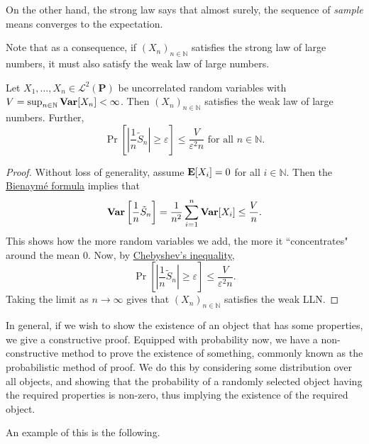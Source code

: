 \vspace{1mm}
On the other hand, the strong law says that almost surely, the sequence of \textit{sample} means converges to the expectation.

\vspace{2mm}
Note that as a consequence, if $(X_n)_{n\in\mathbb{N}}$ satisfies the strong law of large numbers, it must also satisfy the weak law of large numbers.

\begin{ftheo}
\label{uncorr finite var wLLN}
    Let $X_1,\ldots,X_n\in\mathcal{L}^2(\textbf{P})$ be uncorrelated random variables with $V=\sup_{n\in\mathbb{N}}\operatorname{\textbf{Var}}[X_n]<\infty$. Then $(X_n)_{n\in\mathbb{N}}$ satisfies the weak law of large numbers. Further,
    $$\Pr\left[\left|\frac{1}{n}\tilde{S}_n\right|\geq\varepsilon\right]\leq \frac{V}{\varepsilon^2n}\text{ for all $n\in\mathbb{N}$}.$$
\end{ftheo}
\begin{proof}
    Without loss of generality, assume $\textbf{E}[X_i]=0$ for all $i\in\mathbb{N}$. Then the \hyperref[bienayme formula]{Bienaym\'{e} formula} implies that
    $$\operatorname{\textbf{Var}}\left[\frac{1}{n}\tilde{S}_n\right]=\frac{1}{n^2}\sum_{i=1}^n \operatorname{\textbf{Var}}[X_i] \leq \frac{V}{n}.$$
    This shows how the more random variables we add, the more it ``concentrates" around the mean $0$.
    Now, by \hyperref[chebyshev inequality]{Chebyshev's inequality},
    $$\Pr\left[\left|\frac{1}{n}\tilde{S}_n\right|\geq\varepsilon\right]\leq \frac{V}{\varepsilon^2n}.$$
    Taking the limit as $n\to\infty$ gives that $(X_n)_{n\in\mathbb{N}}$ satisfies the weak LLN.
\end{proof}

In general, if we wish to show the existence of an object that has some properties, we give a constructive proof. Equipped with probability now, we have a non-constructive method to prove the existence of something, commonly known as the probabilistic method of proof. We do this by considering some distribution over all objects, and showing that the probability of a randomly selected object having the required properties is non-zero, thus implying the existence of the required object.

An example of this is the following.

